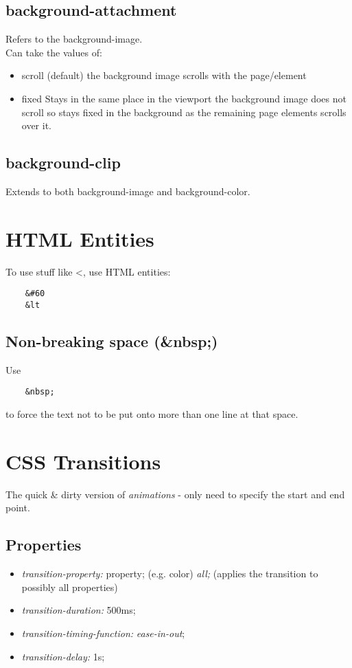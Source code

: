 \documentclass[]{article}
\newcommand{\<}{\guilsinglleft}
\renewcommand{\>}{\guilsinglright}
\renewcommand{\it}[1]{\textit{#1}}
\begin{document}
\subsection{background-attachment}
Refers to the background-image.
\\
Can take the values of:
\begin{itemize}
	\item scroll (default)
	\subitem the background image scrolls with the page/element
	
	\item fixed
	\subitem Stays in the same place in the viewport 
	\subitem the background image does not scroll so stays fixed in the background as the remaining page elements scrolls over it. 
\end{itemize}

\subsection{background-clip}
Extends to both background-image and background-color.

\section{HTML Entities}
To use stuff like <, use HTML entities:
\begin{lstlisting}
	&#60
	&lt
\end{lstlisting}
\subsection{Non-breaking space (\&nbsp;)}
Use 
\begin{lstlisting}
	&nbsp;
\end{lstlisting}
to force the text not to be put onto more than one line at that space.

\section{CSS Transitions}
The quick \& dirty version of \it{animations} - only need to specify the start and end point.
\subsection{Properties}
\begin{itemize}
	\item \it{transition-property:}
	\subitem \<property\>; (e.g. color)
	\subitem \it{all;} (applies the transition to possibly all properties)
	
	\item \it{transition-duration:}
	\subitem 500ms;
	
	\item \it{transition-timing-function:}
	\subitem \it{ease-in-out};
	
	\item \it{transition-delay:}
	\subitem 1s; 
\end{itemize}
\end{document}
